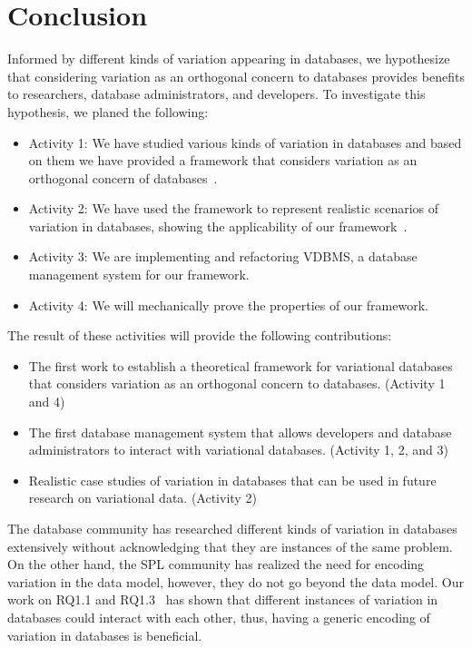 \section{Conclusion}
\label{sec:con}

Informed by different kinds of variation appearing in databases, we hypothesize that considering 
variation as an orthogonal concern to databases provides benefits to researchers, database administrators, and developers.
To investigate this hypothesis, we planed the following:

\begin{itemize}
\item Activity 1: We have studied various kinds of variation in databases and based on them
we have provided a framework that considers variation as an orthogonal concern of databases~\cite{ATW17dbpl,ATW18poly}.
\item Activity 2: We have used the framework to represent realistic scenarios of variation in databases,
showing the applicability of our framework~\cite{ALW21vamos}.
\item Activity 3: We are implementing and refactoring VDBMS, a database management system for our
framework.
\item Activity 4: We will mechanically prove the properties of our framework.
\end{itemize}

\noindent
The result of these activities will provide the following contributions:

\begin{itemize}
\item The first work to establish a theoretical framework for variational databases that considers variation as an orthogonal concern to databases. (Activity 1 and 4)
\item The first database management system that allows developers and database administrators to interact with variational databases. (Activity 1, 2, and 3)
\item Realistic case studies of variation in databases that can be used in future research on variational data. (Activity 2)
\end{itemize}

The database community has researched different kinds of variation in databases extensively without 
acknowledging that they are instances of the same problem. On the other
hand, the SPL community has realized the need for encoding variation in the data model, however,
they do not go beyond the data model. Our work on RQ1.1 and RQ1.3~\cite{ALW21vamos} has
shown that different instances of variation in databases could interact with each other, thus, 
having a generic encoding of variation in databases is beneficial. 